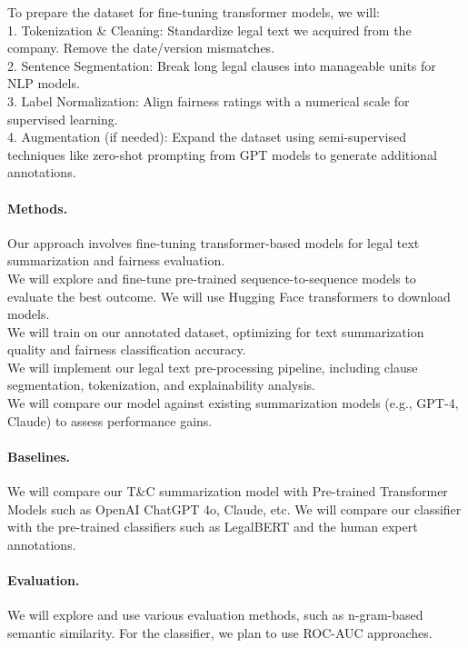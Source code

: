 \documentclass{article}
\begin{document}
To prepare the dataset for fine-tuning transformer models, we will:\\
	1.	Tokenization \& Cleaning: Standardize legal text we acquired from the company. Remove the date/version mismatches.\\
	2.	Sentence Segmentation: Break long legal clauses into manageable units for NLP models.\\
	3.	Label Normalization: Align fairness ratings with a numerical scale for supervised learning.\\
	4.	Augmentation (if needed): Expand the dataset using semi-supervised techniques like zero-shot prompting from GPT models to generate additional annotations.\\

\paragraph{Methods.}

Our approach involves fine-tuning transformer-based models for legal text summarization and fairness evaluation.\\ 

We will explore and fine-tune pre-trained sequence-to-sequence models to evaluate the best outcome.
We will use Hugging Face transformers to download models.\\
We will train on our annotated dataset, optimizing for text summarization quality and fairness classification accuracy. \\ 
We will implement our legal text pre-processing pipeline, including clause segmentation, tokenization, and explainability analysis. \\
We will compare our model against existing summarization models (e.g., GPT-4, Claude) to assess performance gains.

\paragraph{Baselines.}
We will compare our T\&C summarization model with Pre-trained Transformer Models such as OpenAI ChatGPT 4o, Claude, etc.
We will compare our classifier with the pre-trained classifiers such as LegalBERT and the human expert annotations.

\paragraph{Evaluation.}

We will explore and use various evaluation methods, such as n-gram-based semantic similarity. For the classifier, we plan to use ROC-AUC approaches. 
\end{document}
